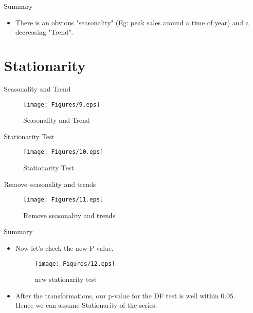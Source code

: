 \documentclass[
 size=12pt,
 paper=smartboard, %
 mode=present, %
 display=slides, %
 style=tuliplab,  %
 pauseslide,
 fleqn,leqno,clock]{powerdot}
\begin{document}
\begin{slide}{Summary}
  \begin{itemize}
    \item
          There is an obvious "seasonality" (Eg: peak sales around a time of year)
          and a decreasing "Trend".
  \end{itemize}
\end{slide}

\section{Stationarity}

\begin{slide}{Seasonality and Trend}
  \begin{figure}
    \centering
    \texttt{[image: Figures/9.eps]}
    \caption{Seasonality and Trend}
    \label{Seasonality and Trend}
  \end{figure}
\end{slide}

\begin{slide}{Stationarity Test}
  \begin{figure}
    \centering
    \texttt{[image: Figures/10.eps]}
    \caption{Stationarity Test}
    \label{Stationarity Test}
  \end{figure}
\end{slide}

\begin{slide}{Remove seasonality and trends}
  \begin{figure}
    \centering
    \texttt{[image: Figures/11.eps]}
    \caption{Remove seasonality and trends}
    \label{Remove seasonality and trends}
  \end{figure}
\end{slide}

\begin{slide}{Summary}
  \begin{itemize}
    \item
          Now let's check the new P-value.
          \begin{figure}
            \centering
            \texttt{[image: Figures/12.eps]}
            \caption{new stationarity test}
            \label{new stationarity test}
          \end{figure}
    \item
          After the transformations, our p-value for the DF test is well within 0.05.
          Hence we can assume Stationarity of the series.
  \end{itemize}
\end{slide}
\end{document}
